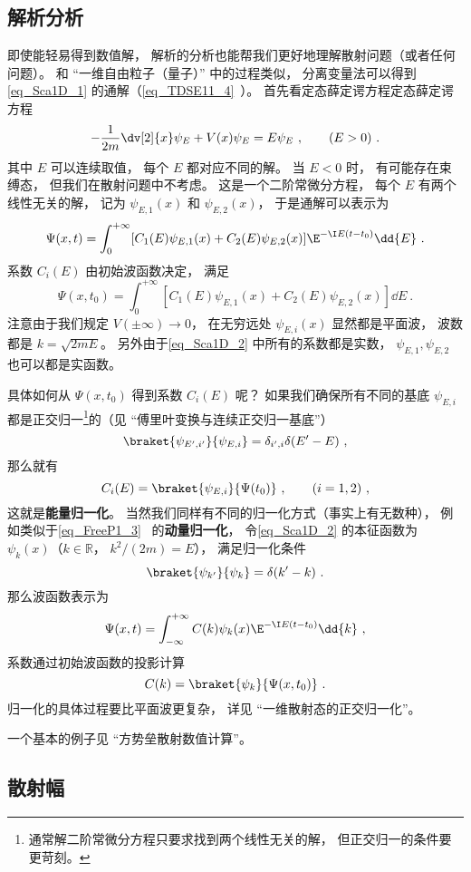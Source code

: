 \subsection{解析分析}
即使能轻易得到数值解， 解析的分析也能帮我们更好地理解散射问题（或者任何问题）。 和 “一维自由粒子（量子）” 中的过程类似， 分离变量法可以得到\autoref{eq_Sca1D_1} 的通解（\autoref{eq_TDSE11_4}~）。 首先看定态薛定谔方程定态薛定谔方程
\begin{equation}\label{eq_Sca1D_2}
-\frac{1}{2m}\dv[2]{x}\psi_E + V(x) \psi_E = E \psi_E ~,\qquad (E > 0)~.
\end{equation}
其中 $E$ 可以连续取值， 每个 $E$ 都对应不同的解。 当 $E< 0$ 时， 有可能存在束缚态， 但我们在散射问题中不考虑。 这是一个二阶常微分方程， 每个 $E$ 有两个线性无关的解， 记为 $\psi_{E,1}(x)$ 和 $\psi_{E,2}(x)$， 于是通解可以表示为
\begin{equation}
\Psi(x, t) = \int_0^{+\infty} [C_1(E) \psi_{E,1}(x) + C_2(E) \psi_{E,2}(x)] \E^{-\I E (t-t_0)} \dd{E}~.
\end{equation}
系数 $C_i(E)$ 由初始波函数决定， 满足
\begin{equation}
\Psi(x, t_0) = \int_0^{+\infty} [C_1(E) \psi_{E,1}(x) + C_2(E) \psi_{E,2}(x)] \dd{E}~.
\end{equation}
注意由于我们规定 $V(\pm\infty)\to 0$， 在无穷远处 $\psi_{E,i}(x)$ 显然都是平面波， 波数都是 $k = \sqrt{2mE}$。 另外由于\autoref{eq_Sca1D_2} 中所有的系数都是实数， $\psi_{E,1}, \psi_{E,2}$ 也可以都是实函数。

具体如何从 $\Psi(x, t_0)$ 得到系数 $C_i(E)$ 呢？ 如果我们确保所有不同的基底 $\psi_{E,i}$ 都是正交归一\footnote{通常解二阶常微分方程只要求找到两个线性无关的解， 但正交归一的条件要更苛刻。}的（见 “傅里叶变换与连续正交归一基底”）
\begin{equation}
\braket{\psi_{E',i'}}{\psi_{E,i}} = \delta_{i',i}\delta(E' - E)~,
\end{equation}
那么就有
\begin{equation}
C_i(E) = \braket{\psi_{E,i}}{\Psi(t_0)}~, \qquad (i = 1,2)~,
\end{equation}
这就是\textbf{能量归一化}。 当然我们同样有不同的归一化方式（事实上有无数种）， 例如类似于\autoref{eq_FreeP1_3}~ 的\textbf{动量归一化}， 令\autoref{eq_Sca1D_2} 的本征函数为 $\psi_{k}(x)$（$k \in \mathbb R$， $k^2/(2m) = E$）， 满足归一化条件
\begin{equation}
\braket{\psi_{k'}}{\psi_{k}} = \delta(k' - k)~.
\end{equation}
那么波函数表示为
\begin{equation}\label{eq_Sca1D_3}
\Psi(x, t) = \int_{-\infty}^{+\infty} C(k) \psi_k(x)\E^{-\I E (t-t_0)} \dd{k}~,
\end{equation}
系数通过初始波函数的投影计算
\begin{equation}
C(k) = \braket{\psi_k}{\Psi(x, t_0)}~.
\end{equation}
归一化的具体过程要比平面波更复杂， 详见 “一维散射态的正交归一化”。

一个基本的例子见 “方势垒散射数值计算”。

\subsection{散射幅}
